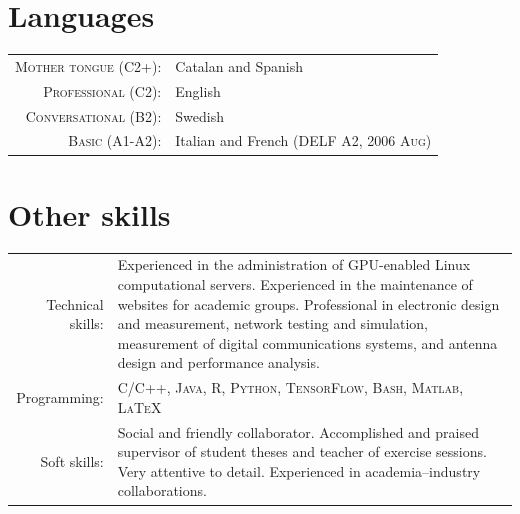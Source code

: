 \documentclass[a4paper,10pt]{article}
\begin{document}

  \vspace{-10pt}
  
  \section{Languages}

    \begin{tabular}{rp{10cm}}
      
      \textsc{Mother tongue (C2+):} & Catalan and Spanish \\
      
      \textsc{Professional (C2):} & English \\
      
      \textsc{Conversational (B2):} & Swedish \\
      
      \textsc{Basic (A1-A2):} & Italian and French (\textsc{DELF} A2, \textsc{2006 Aug})
      
    \end{tabular}


  \vspace{-15pt}
  
  \section{Other skills}

  \begin{tabular}{rp{12cm}}
	Technical skills:  & Experienced in the administration of GPU-enabled Linux computational servers.
						 Experienced in the maintenance of websites for academic groups.
						 Professional in electronic design and measurement, network testing and 
						 simulation, measurement of digital communications systems, and antenna design
						 and performance analysis. \vspace{5pt}\\ 
	Programming:       &  \textsc{C/C++, Java, R, Python, TensorFlow, Bash, Matlab, \LaTeX}  \vspace{5pt}\\ 
	Soft skills: 	   & Social and friendly collaborator. Accomplished and praised supervisor of 
						 student theses and teacher of exercise sessions. Very attentive to 
						 detail. Experienced in academia--industry collaborations.

  \end{tabular}
\end{document}
